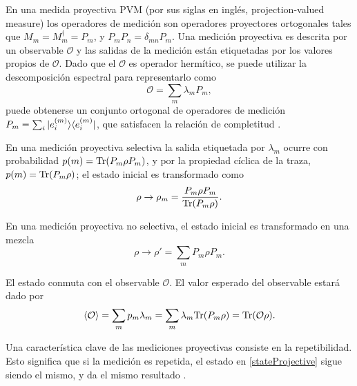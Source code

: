 En una medida proyectiva PVM (por sus siglas en inglés, projection-valued
measure) los operadores de medición son operadores proyectores ortogonales
tales que $M_{m}=M_{m}^{\dagger}=P_{m}$, y $P_{m}P_{n}=\delta_{mn}P_{m}$. Una
medición proyectiva es descrita por un observable $\mathcal{O}$ y las salidas
de la medición están etiquetadas por los valores propios de $\mathcal{O}$. Dado
que el $\mathcal{O}$ es operador hermítico, se puede utilizar la descomposición
espectral para representarlo como 
\begin{equation}
	\mathcal{O}=\sum_m \lambda_m P_m ,
\end{equation}
puede obtenerse un conjunto ortogonal de operadores de medición $P_m=\sum_i
|e_i^{(m)}\rangle \langle e_i^{(m)}|$, que satisfacen la relación de completitud
{\cite{2007geometry}}. 

En una medición proyectiva selectiva la salida etiquetada por $\lambda_m$
ocurre con probabilidad $p(m)={\rm Tr}(P_m\rho P_m)$, y por la propiedad cíclica de
la traza,  $p(m)={\rm Tr}(P_m\rho)$; el estado inicial es transformado como 
\begin{equation}\label{stateProjective}
	\rho\to	\rho_m=\dfrac{P_m\rho P_m}{{\rm Tr}(P_m \rho)}.
\end{equation}

 En una medición proyectiva no selectiva, el estado inicial es transformado en
una mezcla  
\begin{equation}
	\rho \to \rho'=\sum_m P_m \rho P_m.
\end{equation} 


El estado conmuta con el observable $\mathcal{O}$. El valor esperado del
observable estará dado por 
\begin{equation}
	\langle \mathcal{O} \rangle=\sum_m p_m\lambda_m=\sum_m \lambda_m
{\rm Tr}(P_m\rho)={\rm Tr}(\mathcal{O}\rho).
\end{equation}

Una característica clave de las mediciones proyectivas consiste en la
repetibilidad. Esto significa que si la medición es repetida, el estado en
{\ref{stateProjective}} sigue siendo el mismo, y da el mismo resultado
{\cite{2007geometry}}.
